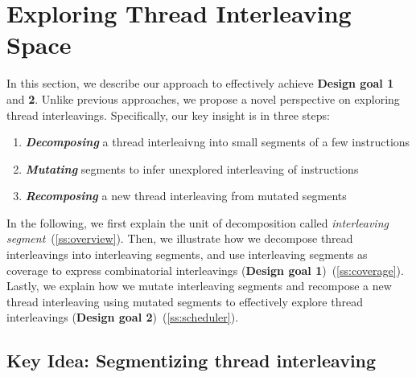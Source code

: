 \section {Exploring Thread Interleaving Space}
\label{s:design}

\newcommand{\intcov}{interleaving segment coverage\xspace}
\newcommand{\Intcov}{Interleaving segment coverage\xspace}


In this section, we describe our approach to effectively achieve
\textbf{Design goal 1} and \textbf{2}.
%
Unlike previous approaches, we propose a novel perspective on
exploring thread interleavings.
%
Specifically, our key insight is in three steps:

\begin{enumerate}[labelsep=0pt, label=\textbf{\arabic*) }]
\item \textbf{\textit{Decomposing}} a thread interleaivng into small
  segments of a few instructions
\item \textbf{\textit{Mutating}} segments to infer unexplored
interleaving of instructions
\item \textbf{\textit{Recomposing}} a new thread interleaving from
  mutated segments
\end{enumerate}







In the following, we first explain the unit of decomposition called
\textit{interleaving segment}~(\autoref{ss:overview}).
%
Then, we illustrate how we decompose thread interleavings into
interleaving segments, and use interleaving segments as coverage to
express combinatorial interleavings (\textbf{Design goal
  1})~(\autoref{ss:coverage}).
%
Lastly, we explain how we mutate interleaving segments and recompose a
new thread interleaving using mutated segments to effectively explore
thread interleavings (\textbf{Design goal
  2})~(\autoref{ss:scheduler}).



\subsection{Key Idea: Segmentizing thread interleaving}
\label{ss:overview}


